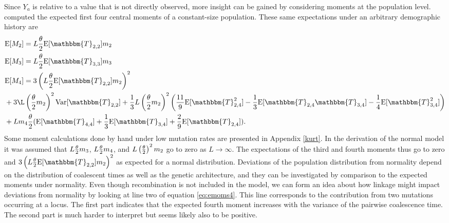 Since $Y_a$ is relative to a value that is not directly observed, more insight
can be gained by considering moments at the population level.
~\citet{Schraiber2015} computed the expected first four central moments of a
constant-size population. These same expectations under an arbitrary demographic
history are
\begin{subequations} \label{eq:emoms}
\begin{align}
  &\E[M_2] = L \T \E[\mathbbm{T}_{2,2}] m_2 \label{eq:emoms2}\\
  &\E[M_3] = L \T \E[\mathbbm{T}_{3,3}] m_3  \label{eq:emoms3}\\
  &\E[M_4] = 3\left(L \T \E[\mathbbm{T}_{2,2}] m_2\right)^2 \nonumber \\
  &+ 3\L \left(\T m_2\right)^2\Var[\mathbbm{T}_{2,2}] + \frac{1}{3}
  L \left(\T m_2\right)^2
    \left( \frac{11}{9} \E[\mathbbm{T}_{2,4}^2]-\frac{1}{3}\E[\mathbbm{T}_{2,4}\mathbbm{T}_{3,4}]-
    \frac{1}{4}\E[\mathbbm{T}_{3,4}^2]\right) \nonumber \\
  &+ L m_4 \T ( \E[\mathbbm{T}_{4,4}] + \frac{1}{3} \E[\mathbbm{T}_{3,4}] +
    \frac{2}{9} \E[\mathbbm{T}_{2,4}] ).
  \label{eq:emoms4}
\end{align}
\end{subequations}
Some moment calculations done by hand under low mutation rates are presented in
Appendix \ref{kurt}. In the derivation of the normal model it was assumed that
$L\frac{\theta}{2} m_3$, $L \frac{\theta}{2} m_4$, and $L \left( \frac{\theta}{2} \right)^2 m_2$ go to zero as $L\to
\infty$. The expectations of the third and fourth moments thus go to zero and
$3\left(L \T \E[\mathbbm{T}_{2,2}] m_2\right)^2$ as expected for a normal distribution.
Deviations of the population distribution from normality depend on the
distribution of coalescent times as well as the genetic architecture, and they
can be investigated by comparison to the expected moments under normality. Even
though recombination is not included in the model, we can form an idea about how
linkage might impact deviations from normality by looking at line two of
equation \eqref{eq:emoms4}. This line corresponds to the contribution from two
mutations occurring at a locus. The first part indicates that the expected
fourth moment increases with the variance of the pairwise coalescence time. The
second part is much harder to interpret but seems likely also to be positive.

